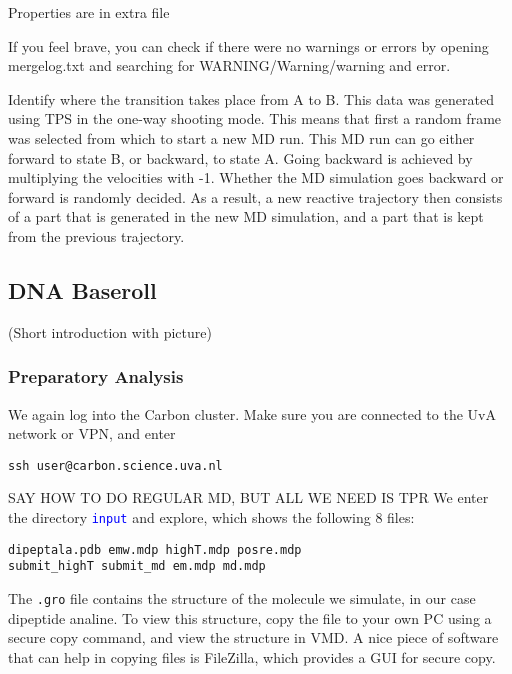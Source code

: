 \documentclass[]{article}
\begin{document}
Properties are in extra file

If you feel brave, you can check if there were no warnings or errors by opening mergelog.txt and searching for WARNING/Warning/warning and error. 




Identify	where	the	transition	takes	place	from	A	to	B.	
This	data	was	generated	using	TPS	in	the	one-way	shooting	mode.	This	means	
that	first	a	random	frame	was	selected	from	which	to	start	a	new	MD	run.	This	
MD	run	can	go	either	forward	to	state	B,	or	backward,	to	state	A.	Going	backward	
is	achieved	by	multiplying	the	velocities	with	-1.	Whether	the	MD	simulation	
goes	backward	or	forward	is	randomly	decided.	As	a	result,	a	new	reactive	
trajectory	then	consists	of	a	part	that	is	generated	in	the	new	MD	simulation,	and	
a	part	that	is	kept	from	the	previous	trajectory.	


\newpage

\subsection*{DNA Baseroll}

(Short introduction with picture)

\subsubsection*{Preparatory Analysis}


We again log into the Carbon cluster. Make sure you are connected to the UvA network or VPN, and enter
%
\begin{lstlisting}
ssh user@carbon.science.uva.nl
\end{lstlisting}
%

SAY HOW TO DO REGULAR MD, BUT ALL WE NEED IS TPR
We enter the directory \texttt{\textcolor{blue}{input}} and explore, which shows the following 8 files:
%
\begin{lstlisting}
dipeptala.pdb emw.mdp highT.mdp posre.mdp 
submit_highT submit_md em.mdp md.mdp
\end{lstlisting}
%
The \texttt{.gro} file contains the structure of the molecule we simulate, in our case dipeptide analine. To view this structure, copy the file to your own PC using a secure copy command, and view the structure in VMD. A nice piece of software that can help in copying files is FileZilla, which provides a GUI for secure copy.
\end{document}
